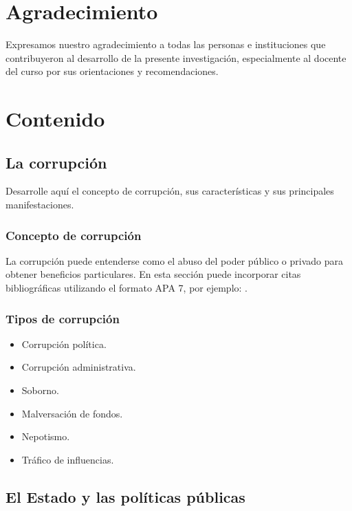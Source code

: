 \documentclass[12pt,a4paper]{article}
\begin{document}
\section*{Agradecimiento}

Expresamos nuestro agradecimiento a todas las personas e instituciones que contribuyeron al desarrollo de la presente investigación, especialmente al docente del curso por sus orientaciones y recomendaciones.

\section{Contenido}

\subsection{La corrupción}

Desarrolle aquí el concepto de corrupción, sus características y sus principales manifestaciones.

\subsubsection{Concepto de corrupción}

La corrupción puede entenderse como el abuso del poder público o privado para obtener beneficios particulares. En esta sección puede incorporar citas bibliográficas utilizando el formato APA 7, por ejemplo: \parencite{transparencia2023}.

\subsubsection{Tipos de corrupción}

\begin{itemize}
    \item Corrupción política.
    \item Corrupción administrativa.
    \item Soborno.
    \item Malversación de fondos.
    \item Nepotismo.
    \item Tráfico de influencias.
\end{itemize}

\subsection{El Estado y las políticas públicas}
\end{document}
